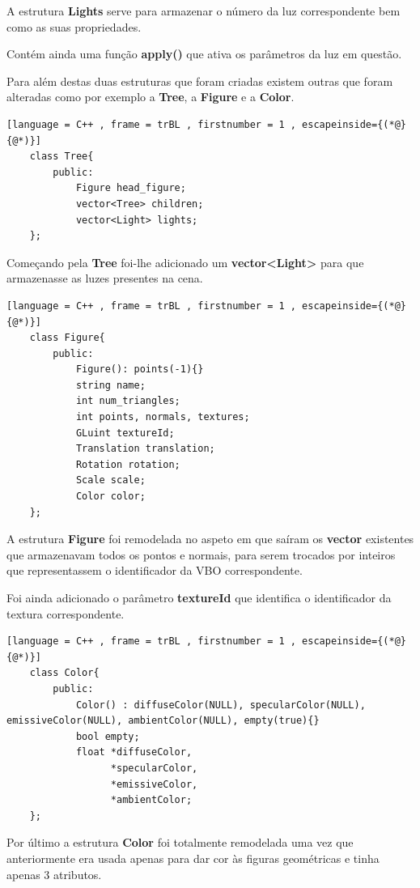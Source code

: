 \documentclass[a4paper]{article}
\begin{document}
A estrutura \textbf{Lights} serve para armazenar o número da luz correspondente bem como as suas propriedades.

Contém ainda uma função \textbf{apply()} que ativa os parâmetros da luz em questão.

Para além destas duas estruturas que foram criadas existem outras que foram alteradas como por exemplo a \textbf{Tree}, a \textbf{Figure} e a \textbf{Color}.

 \begin{lstlisting}[language = C++ , frame = trBL , firstnumber = 1 , escapeinside={(*@}{@*)}]
	class Tree{
        public:
            Figure head_figure;
            vector<Tree> children;
            vector<Light> lights;
    };
\end{lstlisting}

Começando pela \textbf{Tree} foi-lhe adicionado um \textbf{vector<Light>} para que armazenasse as luzes presentes na cena.


 \begin{lstlisting}[language = C++ , frame = trBL , firstnumber = 1 , escapeinside={(*@}{@*)}]
	class Figure{
        public:
            Figure(): points(-1){}
            string name;
            int num_triangles;
            int points, normals, textures;
            GLuint textureId;
            Translation translation;
            Rotation rotation;
            Scale scale;
            Color color;
    };
\end{lstlisting}

A estrutura \textbf{Figure} foi remodelada no aspeto em que saíram os \textbf{vector} existentes que armazenavam todos os pontos e normais, para serem trocados por inteiros que representassem o identificador da VBO correspondente.

Foi ainda adicionado o parâmetro \textbf{textureId} que identifica o identificador da textura correspondente.

 \begin{lstlisting}[language = C++ , frame = trBL , firstnumber = 1 , escapeinside={(*@}{@*)}]
	class Color{
        public:
            Color() : diffuseColor(NULL), specularColor(NULL), emissiveColor(NULL), ambientColor(NULL), empty(true){}
	        bool empty;
	        float *diffuseColor,
		          *specularColor,
		          *emissiveColor,
                  *ambientColor;
    };
\end{lstlisting}

Por último a estrutura \textbf{Color} foi totalmente remodelada uma vez que anteriormente era usada apenas para dar cor às figuras geométricas e tinha apenas 3 atributos.
\end{document}
